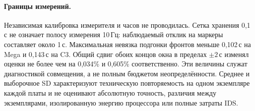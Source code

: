 \paragraph{Границы измерений.}
Независимая калибровка измерителя и часов не проводилась. Сетка хранения 0,1\,с не означает полосу измерения 10\,Гц: наблюдаемый отклик на маркеры составляет около 1\,с. Максимальная невязка подгонки фронтов меньше 0,102\,с на Mega и 0,143\,с на C3. Общий сдвиг обоих концов окна в пределах $\pm2$\,с изменял оценки не более чем на 0,034\% и 0,605\% соответственно. Эти величины служат диагностикой совмещения, а не полным бюджетом неопределённости. Среднее и выборочное SD характеризуют техническую повторяемость на одном экземпляре каждой платы и не оценивают абсолютную точность, различия между экземплярами, изолированную энергию процессора или полные затраты IDS.
